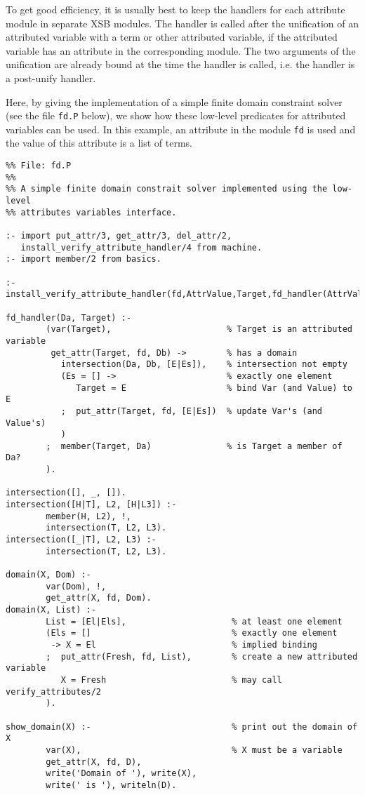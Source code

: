 To get good efficiency, it is usually best to keep the
handlers for each attribute module in separate XSB modules.
The handler is called after the unification of an attributed variable
with a term or other attributed variable, if the attributed variable
has an attribute in the corresponding module. The two arguments of the
unification are already bound at the time the handler is called,
i.e. the handler is a post-unify handler.

Here, by giving the implementation of a simple finite domain
constraint solver (see the file \texttt{fd.P} below), we show how
these low-level predicates for attributed variables can be used.  In
this example, an attribute in the module \texttt{fd} is used and the
value of this attribute is a list of terms.

\begin{small}
\begin{verbatim}
%% File: fd.P
%%
%% A simple finite domain constrait solver implemented using the low-level 
%% attributes variables interface.  

:- import put_attr/3, get_attr/3, del_attr/2, 
   install_verify_attribute_handler/4 from machine.
:- import member/2 from basics.

:- install_verify_attribute_handler(fd,AttrValue,Target,fd_handler(AttrValue,Target)).

fd_handler(Da, Target) :-
        (var(Target),                       % Target is an attributed variable
         get_attr(Target, fd, Db) ->        % has a domain
           intersection(Da, Db, [E|Es]),    % intersection not empty
           (Es = [] ->                      % exactly one element
              Target = E                    % bind Var (and Value) to E
           ;  put_attr(Target, fd, [E|Es])  % update Var's (and Value's)
           )
        ;  member(Target, Da)               % is Target a member of Da?
        ).

intersection([], _, []).
intersection([H|T], L2, [H|L3]) :-
        member(H, L2), !,
        intersection(T, L2, L3).
intersection([_|T], L2, L3) :-
        intersection(T, L2, L3).

domain(X, Dom) :- 
        var(Dom), !, 
        get_attr(X, fd, Dom). 
domain(X, List) :- 
        List = [El|Els],                     % at least one element 
        (Els = []                            % exactly one element
         -> X = El                           % implied binding 
        ;  put_attr(Fresh, fd, List),        % create a new attributed variable
           X = Fresh                         % may call verify_attributes/2
        ).

show_domain(X) :-                            % print out the domain of X
        var(X),                              % X must be a variable
        get_attr(X, fd, D),
        write('Domain of '), write(X),
        write(' is '), writeln(D).

\end{verbatim}
\end{small}


